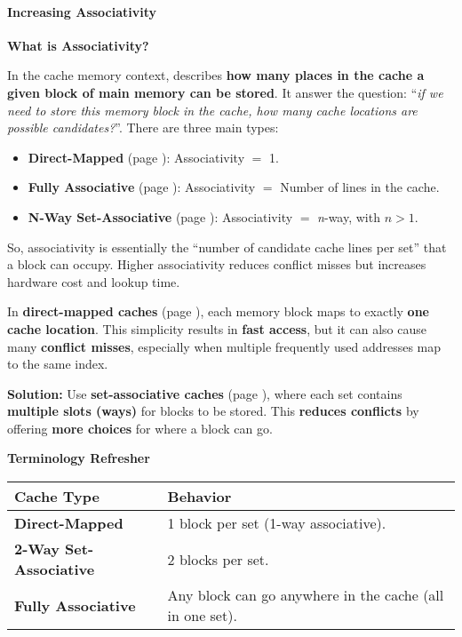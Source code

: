 \paragraph{Increasing Associativity}\label{paragraph: Increasing Associativity}

\begin{flushleft}
    \textcolor{Green3}{ \textbf{What is Associativity?}}
\end{flushleft}
In the cache memory context,  describes \textbf{how many places in the cache a given block of main memory can be stored}. It answer the question: ``\emph{if we need to store this memory block in the cache, how many cache locations are possible candidates?}''. There are three main types:
\begin{itemize}
    \item \textbf{Direct-Mapped} (page \pageref{def: Direct-Mapped Cache}): Associativity $=$ 1.
    \item \textbf{Fully Associative} (page \pageref{def: Fully Associative Cache}): Associativity $=$ Number of lines in the cache.
    \item \textbf{N-Way Set-Associative} (page \pageref{def: n-way set-associative cache}): Associativity $=$ \emph{n}-way, with $n > 1$.
\end{itemize}
So, associativity is essentially the ``number of candidate cache lines per set'' that a block can occupy. Higher associativity reduces conflict misses but increases hardware cost and lookup time.

\highspace
In \textbf{direct-mapped caches} (page \pageref{def: Direct-Mapped Cache}), each memory block maps to exactly \textbf{one cache location}. This simplicity results in \textbf{fast access}, but it can also cause many \textbf{conflict misses}, especially when multiple frequently used addresses map to the same index.

\highspace
\textcolor{Green3}{ \textbf{Solution:}} Use \textbf{set-associative caches} (page \pageref{def: n-way set-associative cache}), where each set contains \textbf{multiple slots (ways)} for blocks to be stored. This \textbf{reduces conflicts} by offering \textbf{more choices} for where a block can go.

\highspace
\begin{flushleft}
    \textcolor{Green3}{ \textbf{Terminology Refresher}}
\end{flushleft}
\begin{table}[!htp]
    \centering
    \begin{tabular}{@{} l p{22em} @{}}
        \toprule
        Cache Type & Behavior \\
        \midrule
        \textbf{Direct-Mapped}          & 1 block per set (1-way associative). \\ [.3em]
        \textbf{2-Way Set-Associative}  & 2 blocks per set. \\ [.3em]
        \textbf{Fully Associative}      & Any block can go anywhere in the cache (all in one set). \\
        \bottomrule
    \end{tabular}
\end{table}

